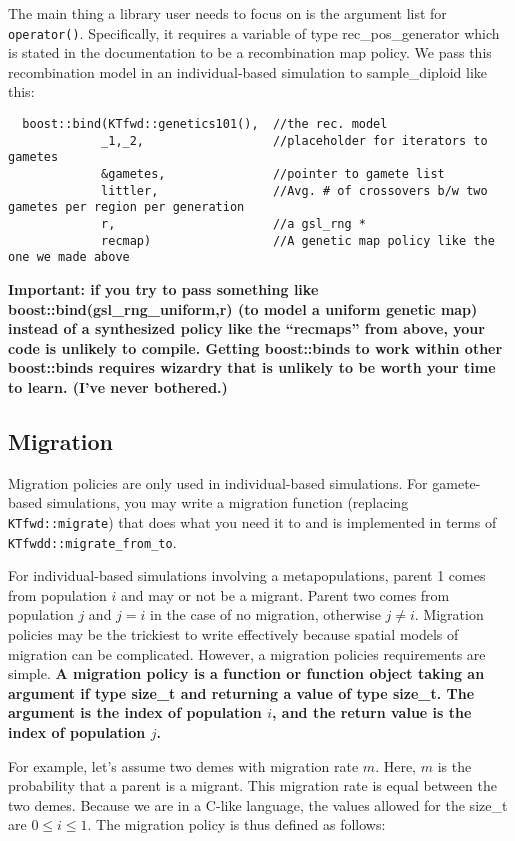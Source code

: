 \documentclass{article}
\begin{document}
The main thing a library user needs to focus on is the argument list for \texttt{operator()}.  Specifically, it requires a variable of type rec\_pos\_generator which is stated in the documentation to be a recombination map policy. We pass this recombination model in an individual-based simulation to sample\_diploid like this:

\begin{lstlisting}
  boost::bind(KTfwd::genetics101(),  //the rec. model
             _1,_2,                  //placeholder for iterators to gametes
             &gametes,               //pointer to gamete list
             littler,                //Avg. # of crossovers b/w two gametes per region per generation
             r,                      //a gsl_rng *
             recmap)                 //A genetic map policy like the one we made above
\end{lstlisting}

\textbf{Important: if you try to pass something like boost::bind(gsl\_rng\_uniform,r) (to model a uniform genetic map) instead of a synthesized policy like the ``recmaps'' from above, your code is unlikely to compile.  Getting boost::binds to work within other boost::binds requires wizardry that is unlikely to be worth your time to learn.  (I've never bothered.)}
\subsection{Migration}
Migration policies are only used in individual-based simulations.  For gamete-based simulations, you may write a migration function (replacing \texttt{KTfwd::migrate}) that does what you need it to and is implemented in terms of \texttt{KTfwdd::migrate\_from\_to}.

For individual-based simulations involving a metapopulations, parent 1 comes from population $i$ and may or not be a migrant.  Parent two comes from population $j$ and $j = i$ in the case of no migration, otherwise $j \neq i$.  Migration policies may be the trickiest to write effectively because spatial models of migration can be complicated.  However, a migration policies requirements are simple.  \textbf{A migration policy is a function or function object taking an argument if type size\_t and returning a value of type size\_t.  The argument is the index of population $i$, and the return value is the index of population $j$.}

For example, let's assume two demes with migration rate $m$.  Here, $m$ is the probability that a parent is a migrant. This migration rate is equal between the two demes.  Because we are in a C-like language, the values allowed for the size\_t are $0 \leq i \leq 1$.  The migration policy is thus defined as follows:
\end{document}
